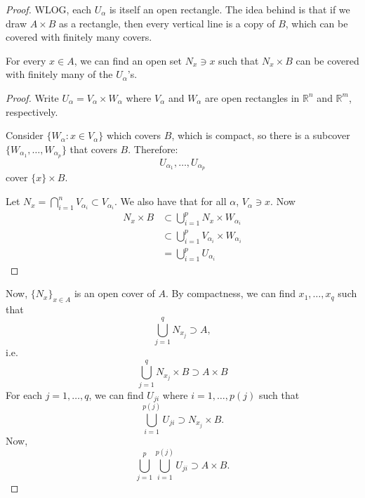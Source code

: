 \begin{itemize}
\begin{proof}
              WLOG, each $U_\alpha$ is itself an open rectangle. The idea behind is that if we draw $A\times B$ as a rectangle, then every vertical line is a copy of $B$, which can be covered with finitely many covers.
              \begin{lemma}
                  For every $x\in A$, we can find an open set $N_x \ni x$ such that $N_x\times B$ can be covered with finitely many of the $U_\alpha$'s.
                  \begin{proof}
                      Write $U_\alpha = V_\alpha \times W_\alpha$ where $V_\alpha$ and $W_\alpha$ are open rectangles in $\mathbb{R}^n$ and $\mathbb{R}^m$, respectively.
                      \vspace{2mm}

                      Consider $\{W_\alpha: x \in V_\alpha\}$ which covers $B$, which is compact, so there is a subcover $\{W_{\alpha_1},\dots,W_{\alpha_p}\}$ that covers $B$. Therefore:
                      \begin{equation}
                          U_{\alpha_1},\dots,U_{\alpha_p}
                      \end{equation}
                      cover $\{x\}\times B$.
                      \vspace{2mm}

                      Let $N_x = \bigcap_{i=1}^n V_{\alpha_i} \subset V_{\alpha_i}$. We also have that for all $\alpha$, $V_\alpha \ni x$. Now
                      \begin{align}
                          N_x \times B & \subset \bigcup_{i=1}^p N_x \times W_{\alpha_i}         \\
                                       & \subset \bigcup_{i=1}^p V_{\alpha_i}\times W_{\alpha_i} \\
                                       & = \bigcup_{i=1}^p U_{\alpha_i}
                      \end{align}
                  \end{proof}
              \end{lemma}
              Now, $\{N_x\}_{x\in A}$ is an open cover of $A$. By compactness, we can find $x_1,\dots,x_q$ such that 
              \begin{equation}
                  \bigcup_{j=1}^q N_{x_j} \supset A,
              \end{equation}
              i.e.
              \begin{equation}
                  \bigcup_{j=1}^q N_{x_j}\times B \supset A\times B
              \end{equation}
              For each $j=1,\dots,q$, we can find $U_{ji}$ where $i=1,\dots,p(j)$ such that
              \begin{equation}
                  \bigcup_{i=1}^{p(j)} U_{ji}\supset N_{x_j}\times B.
              \end{equation}
              Now,
              \begin{equation}
                  \bigcup_{j=1}^p \bigcup_{i=1}^{p(j)}U_{ji} \supset A\times B.
              \end{equation}
          \end{proof}


\end{itemize}
